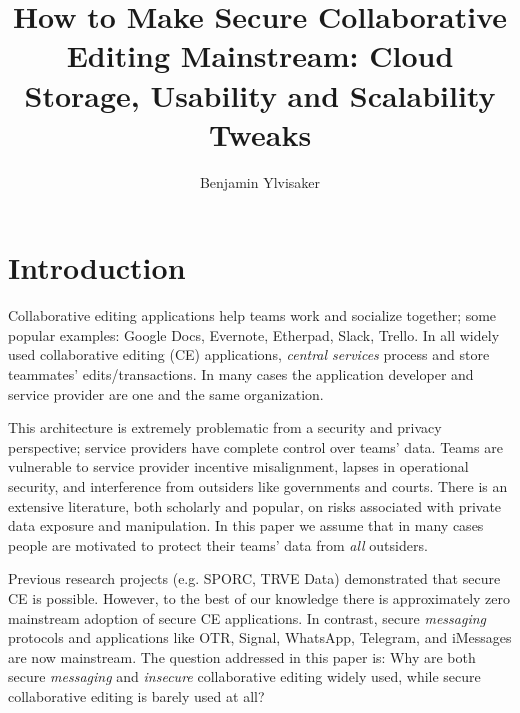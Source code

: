 \documentclass{article}
\begin{document}
\title{How to Make Secure Collaborative Editing Mainstream: Cloud Storage, Usability and Scalability Tweaks}
\author{Benjamin Ylvisaker}
\date{}

\maketitle

\section{Introduction}

Collaborative editing applications help teams work and socialize together; some popular examples: Google Docs, Evernote, Etherpad, Slack, Trello.
In all widely used collaborative editing (CE) applications, \emph{central services} process and store teammates' edits/transactions.
In many cases the application developer and service provider are one and the same organization.

This architecture is extremely problematic from a security and privacy perspective; service providers have complete control over teams' data.
Teams are vulnerable to service provider incentive misalignment, lapses in operational security, and interference from outsiders like governments and courts.
There is an extensive literature, both scholarly and popular, on risks associated with private data exposure and manipulation.
In this paper we assume that in many cases people are motivated to protect their teams' data from \emph{all} outsiders.

Previous research projects (e.g. SPORC\cite{TODO}, TRVE Data\cite{TODO}) demonstrated that secure CE is possible.
However, to the best of our knowledge there is approximately zero mainstream adoption of secure CE applications.
In contrast, secure \emph{messaging} protocols and applications like OTR, Signal, WhatsApp, Telegram, and iMessages \cite{TODO} are now mainstream.
The question addressed in this paper is: Why are both secure \emph{messaging} and \emph{insecure} collaborative editing widely used, while secure collaborative editing is barely used at all?\footnotemark{}

\end{document}
